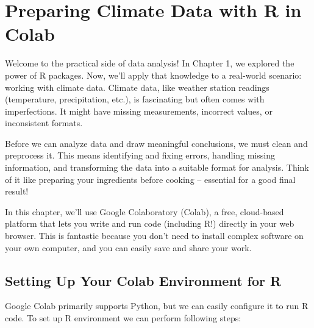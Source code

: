 \chapter{Preparing Climate Data with R in Colab}

Welcome to the practical side of data analysis! In Chapter 1, we explored the power of R packages. Now, we’ll apply that knowledge to a real-world scenario: working with climate data. Climate data, like weather station readings (temperature, precipitation, etc.), is fascinating but often comes with imperfections. It might have missing measurements, incorrect values, or inconsistent formats.

Before we can analyze data and draw meaningful conclusions, we must clean and preprocess it. This means identifying and fixing errors, handling missing information, and transforming the data into a suitable format for analysis. Think of it like preparing your ingredients before cooking – essential for a good final result!

In this chapter, we’ll use Google Colaboratory (Colab), a free, cloud-based platform that lets you write and run code (including R!) directly in your web browser. This is fantastic because you don’t need to install complex software on your own computer, and you can easily save and share your work.

\section{Setting Up Your Colab Environment for R}

Google Colab primarily supports Python, but we can easily configure it to run R code. To set up R environment we can perform following steps:

